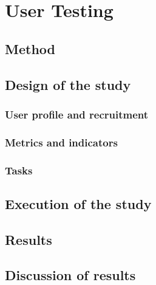 
\section{User Testing}
\subsection{Method}
\subsection{Design of the study}
    \subsubsection{User profile and recruitment}
    \subsubsection{Metrics and indicators}
    \subsubsection{Tasks}
\subsection{Execution of the study}
\subsection{Results}

\subsection{Discussion of results}
